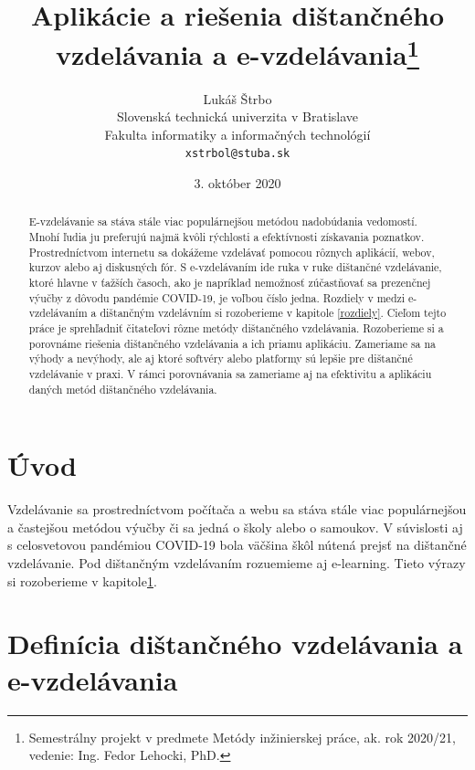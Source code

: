 \documentclass[10pt,oneside,slovak,a4paper]{article}
\title{Aplikácie a riešenia dištančného vzdelávania a e-vzdelávania\thanks{Semestrálny projekt v predmete Metódy inžinierskej práce, ak. rok 2020/21, vedenie: Ing. Fedor Lehocki, PhD.}}
\author{Lukáš Štrbo\\[2pt]
	{\small Slovenská technická univerzita v Bratislave}\\
	{\small Fakulta informatiky a informačných technológií}\\
	{\small \texttt{xstrbol@stuba.sk}}
	}
\date{\small 3. október 2020}
\begin{document}
\maketitle

\begin{abstract}
E-vzdelávanie sa stáva stále viac populárnejšou metódou nadobúdania vedomostí. Mnohí ľudia ju preferujú najmä kvôli rýchlosti a efektívnosti získavania poznatkov.
Prostredníctvom internetu sa dokážeme vzdelávať pomocou rôznych aplikácií, webov, kurzov alebo aj diskusných fór.
S e-vzdelávaním ide ruka v ruke dištančné vzdelávanie, ktoré hlavne v ťažších časoch, ako je napríklad nemožnosť zúčastňovať sa prezenčnej výučby z dôvodu pandémie COVID-19, 
 je voľbou číslo jedna. Rozdiely v medzi e-vzdelávaním a dištančným vzdelávním si rozoberieme v kapitole \ref{rozdiely}. Cieľom tejto práce je sprehľadniť čitateľovi rôzne metódy dištančného vzdelávania. Rozoberieme si a porovnáme riešenia dištančného vzdelávania a ich priamu
 aplikáciu. Zameriame sa na výhody a nevýhody, ale aj ktoré softvéry alebo platformy sú lepšie pre dištančné vzdelávanie v praxi. 
 V rámci porovnávania sa zameriame aj na efektivitu a aplikáciu daných metód dištančného vzdelávania.
\end{abstract}



\section*{Úvod} %
\label{uvod}
Vzdelávanie sa prostredníctvom počítača a webu sa stáva stále viac populárnejšou a častejšou metódou výučby či sa jedná o školy alebo o samoukov. V súvislosti aj s celosvetovou pandémiou 
 COVID-19 bola väčšina škôl nútená prejsť na dištančné vzdelávanie. Pod dištančným vzdelávaním rozuemieme aj e-learning. Tieto výrazy si rozoberieme v kapitole\ref{rozdiely}.  

\section{Definícia dištančného vzdelávania a e-vzdelávania}
\label{rozdiely}
\end{document}
